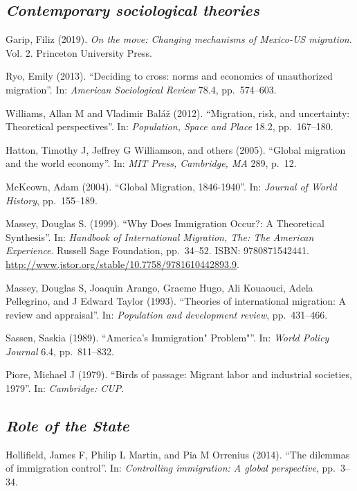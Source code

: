 \documentclass[
  12pt,
]{article}
\begin{document}
\hypertarget{contemporary-sociological-theories}{%
\subsection{\texorpdfstring{\emph{Contemporary sociological
theories}}{Contemporary sociological theories}}\label{contemporary-sociological-theories}}

Garip, Filiz (2019).
\emph{On the move: Changing mechanisms of Mexico-US migration}. Vol. 2.
Princeton University Press.

Ryo, Emily (2013). ``Deciding to cross: norms and economics of
unauthorized migration''. In: \emph{American Sociological Review} 78.4,
pp.~574--603.

Williams, Allan M and Vladimir Baláž (2012). ``Migration, risk, and
uncertainty: Theoretical perspectives''. In:
\emph{Population, Space and Place} 18.2, pp.~167--180.

Hatton, Timothy J, Jeffrey G Williamson, and others (2005). ``Global
migration and the world economy''. In: \emph{MIT Press, Cambridge, MA}
289, p.~12.

McKeown, Adam (2004). ``Global Migration, 1846-1940''. In:
\emph{Journal of World History}, pp.~155--189.

Massey, Douglas S. (1999). ``Why Does Immigration Occur?: A Theoretical
Synthesis''. In:
\emph{Handbook of International Migration, The: The American Experience}.
Russell Sage Foundation, pp.~34--52. ISBN: 9780871542441.
\url{http://www.jstor.org/stable/10.7758/9781610442893.9}.

Massey, Douglas S, Joaquin Arango, Graeme Hugo, Ali Kouaouci, Adela
Pellegrino, and J Edward Taylor (1993). ``Theories of international
migration: A review and appraisal''. In:
\emph{Population and development review}, pp.~431--466.

Sassen, Saskia (1989). ``America's Immigration" Problem"''. In:
\emph{World Policy Journal} 6.4, pp.~811--832.

Piore, Michael J (1979). ``Birds of passage: Migrant labor and
industrial societies, 1979''. In: \emph{Cambridge: CUP}.

\hypertarget{role-of-the-state}{%
\subsection{\texorpdfstring{\emph{Role of the
State}}{Role of the State}}\label{role-of-the-state}}

Hollifield, James F, Philip L Martin, and Pia M Orrenius (2014). ``The
dilemmas of immigration control''. In:
\emph{Controlling immigration: A global perspective}, pp.~3--34.
\end{document}
